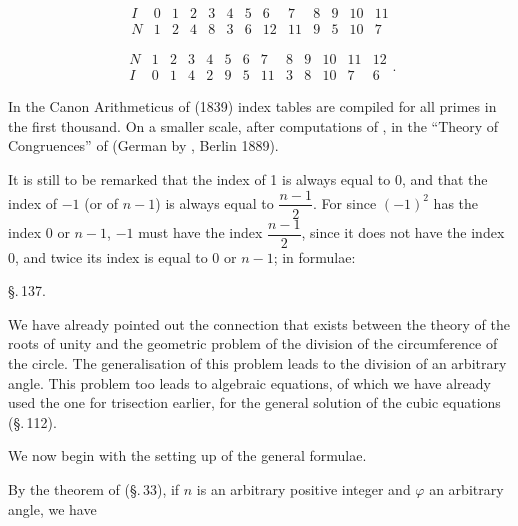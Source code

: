 \[
\begin{array}{c|cccccccccccc}
I & 0 & 1 & 2 & 3 & 4 & 5 & 6 & 7 & 8 & 9 & 10 & 11 \\ \hline
N & 1 & 2 & 4 & 8 & 3 & 6 & 12 & 11 & 9 & 5 & 10 & 7
\end{array}
\]

\[
\begin{array}{c|cccccccccccc}
N & 1 & 2 & 3 & 4 & 5 & 6 & 7 & 8 & 9 & 10 & 11 & 12 \\ \hline
I & 0 & 1 & 4 & 2 & 9 & 5 & 11 & 3 & 8 & 10 & 7 & 6
\end{array}.
\]

In the Canon Arithmeticus of  (1839) index tables
are compiled for all primes in the first thousand. On a smaller
scale, after computations of , in the ``Theory of
Congruences'' of  (German by
, Berlin 1889).

It is still to be remarked that the index of 1 is always equal to 0,
and that the index of $-1$ (or of $n-1$) is always equal to
$\dfrac{n-1}{2}$. For since $(-1)^2$ has the index 0 or $n-1$, $-1$
must have the index $\dfrac{n-1}{2}$, since it does not have the
index 0, and twice its index is equal to 0 or $n-1$; in formulae:

\begin{center}
\S.\,137.

\end{center}

We have already pointed out the connection that exists between the
theory of the roots of unity and the geometric problem of the
division of the circumference of the circle. The generalisation of
this problem leads to the division of an arbitrary angle. This
problem too leads to algebraic equations, of which we have already
used the one for trisection earlier, for the general solution of the
cubic equations (\S.\,112).

We now begin with the setting up of the general formulae.

By the theorem of  (\S.\,33), if $n$ is an
arbitrary positive integer and $\varphi$ an arbitrary angle, we have
